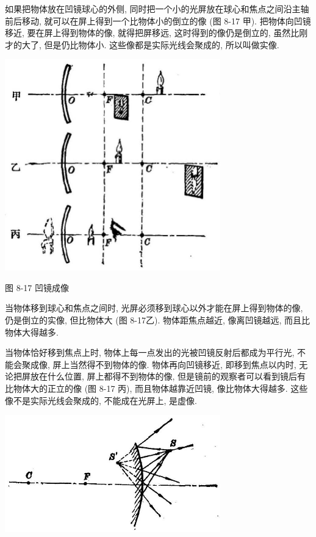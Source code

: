 \documentclass[10pt]{article}
\begin{document}
如果把物体放在凹镜球心的外侧, 同时把一个小的光屏放在球心和焦点之间沿主轴前后移动, 就可以在屏上得到一个比物体小的倒立的像 (图 8-17 甲). 把物体向凹镜移近, 要在屏上得到物体的像, 就得把屏移远, 这时得到的像仍是倒立的, 虽然比刚才的大了, 但是仍比物体小. 这些像都是实际光线会聚成的, 所以叫做实像.

\begin{center}
\includegraphics[max width=0.7\textwidth]{images/01913056-1f15-74d8-9184-9aab52c9d66b_255_208053.jpg}
\end{center}

图 8-17 凹镜成像

当物体移到球心和焦点之间时, 光屏必须移到球心以外才能在屏上得到物体的像, 仍是倒立的实像, 但比物体大 (图 8-17乙). 物体距焦点越近, 像离凹镜越远, 而且比物体大得越多.

当物体恰好移到焦点上时, 物体上每一点发出的光被凹镜反射后都成为平行光, 不能会聚成像, 屏上当然得不到物体的像. 物体再向凹镜移近, 即移到焦点以内时, 无论把屏放在什么位置, 屏上都得不到物体的像, 但是镜前的观察者可以看到镜后有比物体大的正立的像 (图 8-17 丙), 而且物体越靠近凹镜, 像比物体大得越多. 这些像不是实际光线会聚成的, 不能成在光屏上, 是虚像.

\begin{center}
\includegraphics[max width=0.7\textwidth]{images/01913056-1f15-74d8-9184-9aab52c9d66b_256_422504.jpg}
\end{center}
\end{document}
